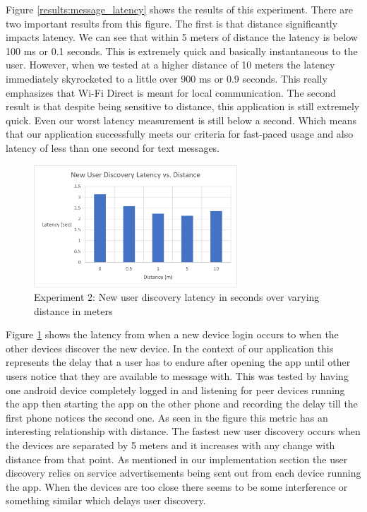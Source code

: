 \documentclass[10pt]{article}
\begin{document}
Figure \ref{results:message_latency} shows the results of this experiment. There are two important results from this figure. The first is that distance significantly impacts latency. We can see that within 5 meters of distance the latency is below 100 ms or 0.1 seconds. This is extremely quick and basically instantaneous to the user. However, when we tested at a higher distance of 10 meters the latency immediately skyrocketed to a little over 900 ms or 0.9 seconds. This really emphasizes that Wi-Fi Direct is meant for local communication. The second result is that despite being sensitive to distance, this application is still extremely quick. Even our worst latency measurement is still below a second. Which means that our application successfully meets our criteria for fast-paced usage and also latency of less than one second for text messages.

\begin{figure}[h!]
    \centering
    \includegraphics[width=3in]{new_user_dicovery_graph.png}
    \caption{Experiment 2: New user discovery latency in seconds over varying distance in meters}
    \label{results:new_user}
\end{figure}

Figure \ref{results:new_user} shows the latency from when a new device login occurs to when the other devices discover the new device. In the context of our application this represents the delay that a user has to endure after opening the app until other users notice that they are available to message with. This was tested by having one android device completely logged in and listening for peer devices running the app then starting the app on the other phone and recording the delay till the first phone notices the second one. As seen in the figure this metric has an interesting relationship with distance. The fastest new user discovery occurs when the devices are separated by 5 meters and it increases with any change with distance from that point. As mentioned in our implementation section the user discovery relies on service advertisements being sent out from each device running the app. When the devices are too close there seems to be some interference or something similar which delays user discovery.
\end{document}
